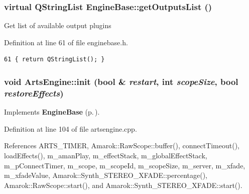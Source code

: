 \subsubsection{\setlength{\rightskip}{0pt plus 5cm}virtual QString\-List Engine\-Base::get\-Outputs\-List ()\hspace{0.3cm}{\tt  [inline, virtual, inherited]}}\label{classEngineBase_EngineBasea6}


Get list of available output plugins 

Definition at line 61 of file enginebase.h.



\footnotesize\begin{verbatim}61 { return QStringList(); }
\end{verbatim}\normalsize 
{}
\subsubsection{\setlength{\rightskip}{0pt plus 5cm}void Arts\-Engine::init (bool \& {\em restart}, int {\em scope\-Size}, bool {\em restore\-Effects})\hspace{0.3cm}{\tt  [virtual]}}\label{classArtsEngine_ArtsEnginea2}




Implements {\bf Engine\-Base} {\rm (p.\,\pageref{classEngineBase_EngineBasea2})}.

Definition at line 104 of file artsengine.cpp.

References ARTS\_\-TIMER, Amarok::Raw\-Scope::buffer(), connect\-Timeout(), load\-Effects(), m\_\-aman\-Play, m\_\-effect\-Stack, m\_\-global\-Effect\-Stack, m\_\-p\-Connect\-Timer, m\_\-scope, m\_\-scope\-Id, m\_\-scope\-Size, m\_\-server, m\_\-xfade, m\_\-xfade\-Value, Amarok::Synth\_\-STEREO\_\-XFADE::percentage(), Amarok::Raw\-Scope::start(), and Amarok::Synth\_\-STEREO\_\-XFADE::start().



